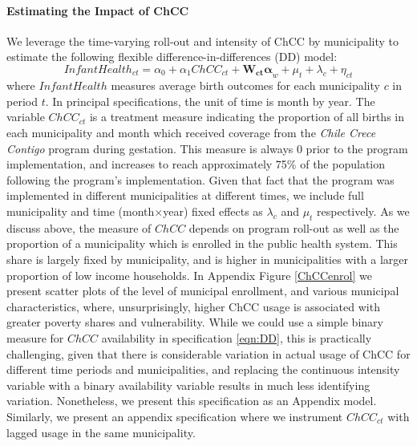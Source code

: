 \documentclass[12pt]{article}
\begin{document}
\begin{spacing}{1.4}
\paragraph{Estimating the Impact of ChCC}
We leverage the time-varying roll-out and intensity of ChCC by
municipality to estimate the following flexible
difference-in-differences (DD) model:
\begin{equation}
  \label{eqn:DD}
  Infant Health_{ct} = \alpha_0 + \alpha_1 ChCC_{ct} + \bm{W_{ct}\alpha}_{w} + \mu_t + \lambda_c + \eta_{ct}
\end{equation}
where $InfantHealth$ measures average birth outcomes for each
municipality $c$ in period $t$.  In principal specifications,
the unit of time is month by year. The variable $ChCC_{ct}$ is
a treatment measure indicating the proportion of all births in
each municipality and month which received coverage from the
\emph{Chile Crece Contigo} program during gestation.  This measure is
always 0 prior to the program implementation, and increases
to reach approximately 75\% of the population following the
program's implementation.  Given that fact that the program
was implemented in different municipalities at different times,
we include full municipality and time (month$\times$year) fixed
effects as $\lambda_c$ and $\mu_t$ respectively.  As we discuss
above, the measure of $ChCC$ depends on program roll-out as
well as the proportion of a municipality which is enrolled in
the public health system.  This share is largely fixed by
municipality, and is higher in municipalities with a larger
proportion of low income households.  In Appendix Figure
\ref{ChCCenrol} we present scatter plots of the level of
municipal enrollment, and various municipal characteristics,
where, unsurprisingly, higher ChCC usage is associated with
greater poverty shares and vulnerability.  While we could use
a simple binary measure for $ChCC$ availability in specification
\ref{eqn:DD}, this is practically challenging, given that
there is considerable variation in actual usage of ChCC for
different time periods and municipalities, and replacing the
continuous intensity variable with a binary availability variable
results in much less identifying variation.  Nonetheless, we
present this specification as an Appendix model.  Similarly,
we present an appendix specification where we instrument
$ChCC_{ct}$ with lagged usage in the same municipality.


\end{spacing}
\end{document}
